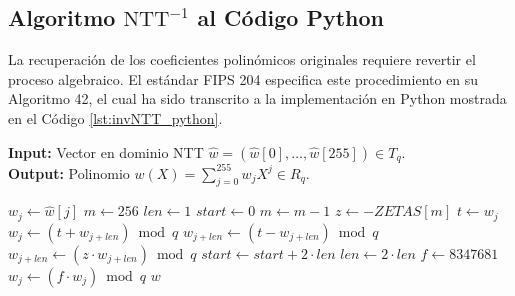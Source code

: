 \documentclass[11pt, a4paper]{report}
\theoremstyle{definition}
\begin{document}
\subsection{Algoritmo $\text{NTT}^{-1}$ al Código Python}

La recuperación de los coeficientes polinómicos originales requiere revertir el proceso algebraico. El estándar FIPS 204 \cite{nist_fips204} especifica este procedimiento en su Algoritmo 42, el cual ha sido transcrito a la implementación en Python mostrada en el Código \ref{lst:invNTT_python}.

\begin{algorithm}[H]
\caption{NTT$^{-1}(\hat{w})$ - Algoritmo 42 del estándar FIPS 204}
\label{alg:invNTT}
\textbf{Input:} Vector en dominio NTT $\hat{w} = (\hat{w}[0], \dots, \hat{w}[255]) \in T_q$. \\
\textbf{Output:} Polinomio $w(X) = \sum_{j=0}^{255} w_j X^j \in R_q$.
\begin{algorithmic}[1]
    \STATE $w_j \gets \hat{w}[j]$
\ENDFOR
\STATE $m \gets 256$
\STATE $len \gets 1$
    \STATE $start \gets 0$
        \STATE $m \gets m - 1$
        \STATE $z \gets -ZETAS[m]$ 
            \STATE $t \gets w_j$
            \STATE $w_j \gets (t + w_{j+len}) \bmod q$
            \STATE $w_{j+len} \gets (t - w_{j+len}) \bmod q$
            \STATE $w_{j+len} \gets (z \cdot w_{j+len}) \bmod q$
        \ENDFOR
        \STATE $start \gets start + 2 \cdot len$
    \ENDWHILE
    \STATE $len \gets 2 \cdot len$
\ENDWHILE
\STATE $f \gets 8347681$ 
    \STATE $w_j \gets (f \cdot w_j) \bmod q$
\ENDFOR
\RETURN $w$
\end{algorithmic}
\end{algorithm}
\end{document}
